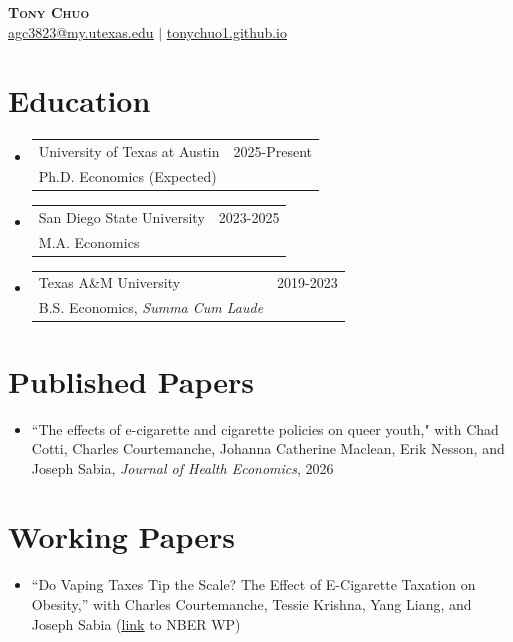 \documentclass[letterpaper,11pt]{article}
\makeatletter
\newcommand{\resumeSubheading}[4]{
  \vspace{-2pt}
    \item
    \begin{tabular*}{0.97\textwidth}[t]{l@{\extracolsep{\fill}}r}
      #1 & #2 \\
      \hspace{0.15in}#3 & {#4} \\
    \end{tabular*}\vspace{-7pt}
}
\newcommand{\resumeSubHeadingListStart}{\begin{itemize}[leftmargin=0.15in, label={}]}
\newcommand{\resumeSubHeadingListEnd}{\end{itemize}}
\makeatother
\begin{document}
\begin{center}
    \textbf{\Huge \scshape Tony Chuo} \\ \vspace{6pt}
    \href{mailto:agc3823@my.utexas.edu}{\underline{agc3823@my.utexas.edu}} 
    $|$ \href{https://tonychuo1.github.io/}{\underline{tonychuo1.github.io}}
\end{center}

%
\section{Education}
  \resumeSubHeadingListStart
    \resumeSubheading
      {University of Texas at Austin}{2025-Present}
      {Ph.D. Economics (Expected)}{}

    \resumeSubheading
      {San Diego State University}{2023-2025}
      {M.A. Economics}{}

    \resumeSubheading
      {Texas A\&M University}{2019-2023}
      {B.S. Economics, \emph{Summa Cum Laude}}{}
  \resumeSubHeadingListEnd

\section{Published Papers}
  \resumeSubHeadingListStart
      \item ``The effects of e-cigarette and cigarette policies on queer youth," 
      with Chad Cotti, Charles Courtemanche,
      Johanna Catherine Maclean, Erik Nesson, and 
      Joseph Sabia, \textit{Journal of Health Economics}, 2026
  \resumeSubHeadingListEnd

\section{Working Papers}
  \resumeSubHeadingListStart
      \item ``Do Vaping Taxes Tip the Scale? The Effect
      of E-Cigarette Taxation on Obesity,'' with
      Charles Courtemanche, Tessie Krishna, Yang Liang,
      and Joseph Sabia (\href{https://www.nber.org/papers/w33890}{\underline{link}} to NBER WP)
  \resumeSubHeadingListEnd
  
\end{document}
